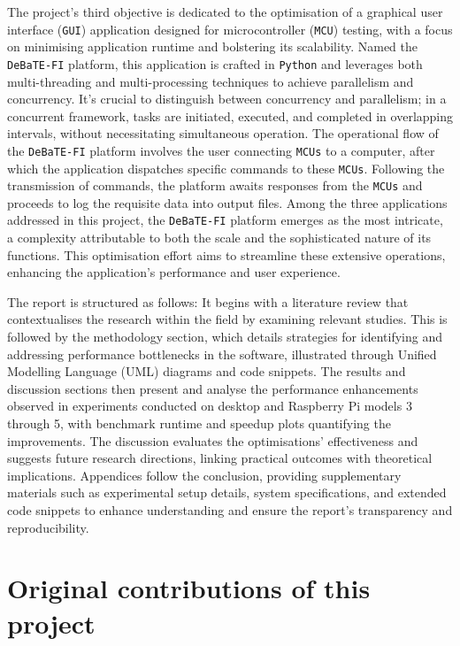 \documentclass[12pt, openany]{book}
\begin{document}
The project's third objective is dedicated to the optimisation of a graphical user interface (\texttt{GUI}) application designed for microcontroller (\texttt{MCU}) testing, with a focus on minimising application runtime and bolstering its scalability. Named the \texttt{DeBaTE-FI} platform\cite{debate_fi_publication}, this application is crafted in \texttt{Python} and leverages both multi-threading and multi-processing techniques to achieve parallelism and concurrency. It's crucial to distinguish between concurrency and parallelism; in a concurrent framework, tasks are initiated, executed, and completed in overlapping intervals, without necessitating simultaneous operation. The operational flow of the \texttt{DeBaTE-FI} platform involves the user connecting \texttt{MCUs} to a computer, after which the application dispatches specific commands to these \texttt{MCUs}. Following the transmission of commands, the platform awaits responses from the \texttt{MCUs} and proceeds to log the requisite data into output files. Among the three applications addressed in this project, the \texttt{DeBaTE-FI} platform emerges as the most intricate, a complexity attributable to both the scale and the sophisticated nature of its functions. This optimisation effort aims to streamline these extensive operations, enhancing the application's performance and user experience.

The report is structured as follows: It begins with a literature review that contextualises the research within the field by examining relevant studies. This is followed by the methodology section, which details strategies for identifying and addressing performance bottlenecks in the software, illustrated through Unified Modelling Language (UML) diagrams and code snippets. The results and discussion sections then present and analyse the performance enhancements observed in experiments conducted on desktop and Raspberry Pi models 3 through 5, with benchmark runtime and speedup plots quantifying the improvements. The discussion evaluates the optimisations' effectiveness and suggests future research directions, linking practical outcomes with theoretical implications. Appendices follow the conclusion, providing supplementary materials such as experimental setup details, system specifications, and extended code snippets to enhance understanding and ensure the report's transparency and reproducibility.

\newpage
\section{Original contributions of this project}
\end{document}
